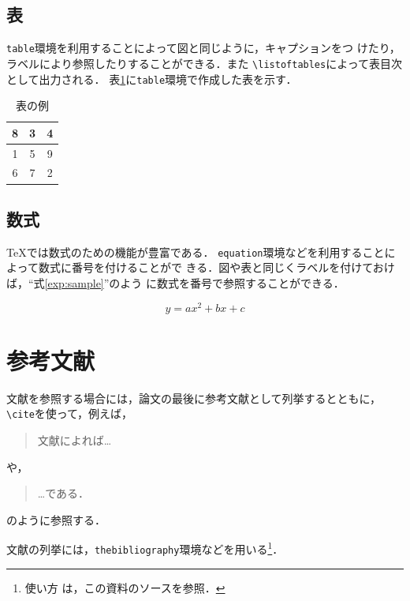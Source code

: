 \documentclass[11pt]{ujreport}
\begin{document}
\section{表}
{\tt table}環境を利用することによって図と同じように，キャプションをつ
けたり，ラベルにより参照したりすることができる．また
\verb|\listoftables|によって表目次として出力される．
表\ref{tab:sample}に{\tt table}環境で作成した表を示す．

\begin{table}
  \caption{表の例}
  \label{tab:sample}
  \begin{center}
    \begin{tabular}{|c|c|c|}
      \hline
      8 & 3 & 4\\
      \hline
      1 & 5 & 9 \\
      \hline
      6 & 7 & 2 \\
      \hline
    \end{tabular}
  \end{center}
\end{table}

\section{数式}
\TeX では数式のための機能が豊富である．
{\tt equation}環境などを利用することによって数式に番号を付けることがで
きる．図や表と同じくラベルを付けておけば，``式\ref{exp:sample}''のよう
に数式を番号で参照することができる．

\begin{equation}
  y = ax^2 + bx + c \label{exp:sample}
\end{equation}

\chapter{参考文献}

文献を参照する場合には，論文の最後に参考文献として列挙するとともに，
\verb|\cite|を使って，例えば，
\begin{quote}
  文献\cite{latex}によれば…
\end{quote}
や，
\begin{quote}
  …である\cite{latex2e}．
\end{quote}
のように参照する．

文献の列挙には，{\tt thebibliography}環境などを用いる\footnote{使い方
は，この資料のソースを参照．}．


\end{document}
